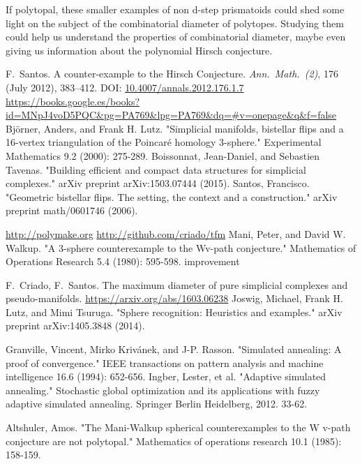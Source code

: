 \documentclass[12pt,a4paper]{article}
\theoremstyle{plain}
\theoremstyle{definition}
\begin{document}
If polytopal, these smaller examples of non d-step prismatoids could shed some light on the subject of the combinatorial diameter of polytopes. Studying them could help us understand the properties of combinatorial diameter, maybe even giving us information about the polynomial Hirsch conjecture.

\begin{thebibliography}{99}
  F.~Santos.
  A counter-example to the Hirsch Conjecture.
  \emph{Ann.~Math.~(2)}, 176 (July 2012), 383--412. 
  DOI: \href{http://dx.doi.org/10.4007/annals.2012.176.1.7}{10.4007/annals.2012.176.1.7}
  \url{https://books.google.es/books?id=MNpJ4voD5PQC&pg=PA769&lpg=PA769&dq=#v=onepage&q&f=false}
  Björner, Anders, and Frank H. Lutz. "Simplicial manifolds, bistellar flips and a 16-vertex triangulation of the Poincaré homology 3-sphere." Experimental Mathematics 9.2 (2000): 275-289.
  Boissonnat, Jean-Daniel, and Sebastien Tavenas. "Building efficient and compact data structures for simplicial complexes." arXiv preprint arXiv:1503.07444 (2015).
  Santos, Francisco. "Geometric bistellar flips. The setting, the context and a construction." arXiv preprint math/0601746 (2006).

  \url{http://polymake.org}
  \url{http://github.com/criado/tfm}
  Mani, Peter, and David W. Walkup. "A 3-sphere counterexample to the Wv-path conjecture." Mathematics of Operations Research 5.4 (1980): 595-598.
 improvement %

  F.~Criado, F.~Santos.
  The maximum diameter of pure simplicial complexes and pseudo-manifolds.
  \url{https://arxiv.org/abs/1603.06238}
  Joswig, Michael, Frank H. Lutz, and Mimi Tsuruga. "Sphere recognition: Heuristics and examples." arXiv preprint arXiv:1405.3848 (2014).

  Granville, Vincent, Mirko Krivánek, and J-P. Rasson. "Simulated annealing: A proof of convergence." IEEE transactions on pattern analysis and machine intelligence 16.6 (1994): 652-656.
  Ingber, Lester, et al. "Adaptive simulated annealing." Stochastic global optimization and its applications with fuzzy adaptive simulated annealing. Springer Berlin Heidelberg, 2012. 33-62.

  Altshuler, Amos. "The Mani-Walkup spherical counterexamples to the W v-path conjecture are not polytopal." Mathematics of operations research 10.1 (1985): 158-159.


\end{thebibliography}
\end{document}
